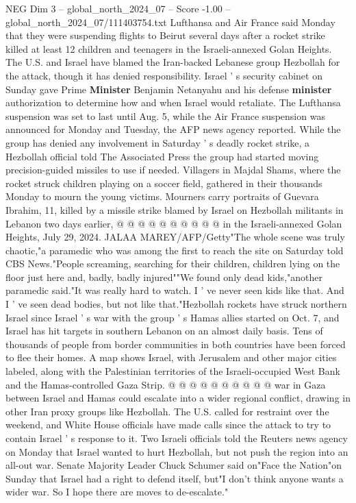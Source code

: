 \begin{textsample}{NEG Dim 3 – global\_north\_2024\_07 – Score -1.00 – global\_north\_2024\_07/111403754.txt}  \label{ex:f3_neg_376}
Lufthansa and Air France said Monday that they were suspending flights to Beirut several days after a rocket strike killed at least 12 children and teenagers in the Israeli-annexed Golan Heights.
The U.S. and Israel have blamed the Iran-backed Lebanese group Hezbollah for the attack, though it has denied responsibility.
Israel ' s security cabinet on Sunday gave Prime \textbf{Minister} Benjamin Netanyahu and his defense \textbf{minister} authorization to determine how and when Israel would retaliate.
The Lufthansa suspension was set to last until Aug. 5, while the Air France suspension was announced for Monday and Tuesday, the AFP news agency reported.
While the group has denied any involvement in Saturday ' s deadly rocket strike, a Hezbollah official told The Associated Press the group had started moving precision-guided missiles to use if needed.
Villagers in Majdal Shams, where the rocket struck children playing on a soccer field, gathered in their thousands Monday to mourn the young victims.
Mourners carry portraits of Guevara Ibrahim, 11, killed by a missile strike blamed by Israel on Hezbollah militants in Lebanon two days earlier, @ @ @ @ @ @ @ @ @ @ in the Israeli-annexed Golan Heights, July 29, 2024.
JALAA MAREY/AFP/Getty"The whole scene was truly chaotic,"a paramedic who was among the first to reach the site on Saturday told CBS News."People screaming, searching for their children, children lying on the floor just here and, badly, badly injured""We found only dead kids,"another paramedic said."It was really hard to watch.
I ' ve never seen kids like that.
And I ' ve seen dead bodies, but not like that."Hezbollah rockets have struck northern Israel since Israel ' s war with the group ' s Hamas allies started on Oct. 7, and Israel has hit targets in southern Lebanon on an almost daily basis.
Tens of thousands of people from border communities in both countries have been forced to flee their homes.
A map shows Israel, with Jerusalem and other major cities labeled, along with the Palestinian territories of the Israeli-occupied West Bank and the Hamas-controlled Gaza Strip. @ @ @ @ @ @ @ @ @ @ war in Gaza between Israel and Hamas could escalate into a wider regional conflict, drawing in other Iran proxy groups like Hezbollah.
The U.S. called for restraint over the weekend, and White House officials have made calls since the attack to try to contain Israel ' s response to it.
Two Israeli officials told the Reuters news agency on Monday that Israel wanted to hurt Hezbollah, but not push the region into an all-out war.
Senate Majority Leader Chuck Schumer said on"Face the Nation"on Sunday that Israel had a right to defend itself, but"I don't think anyone wants a wider war.
So I hope there are moves to de-escalate."

\end{textsample}
